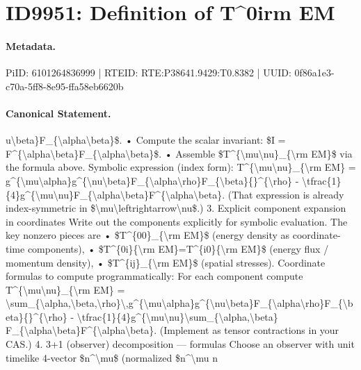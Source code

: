 \section*{ID9951: Definition of T\textasciicircum{}0irm EM}
\paragraph{Metadata.}
PiID: 6101264836999 | RTEID: RTE:P38641.9429:T0.8382 | UUID: 0f86a1e3-c70a-5ff8-8e95-ffa58eb6620b

\paragraph{Canonical Statement.}
u\textbackslash{}beta\}F\_\{\textbackslash{}alpha\textbackslash{}beta\}\$. • Compute the scalar invariant: \$I = F\textasciicircum{}\{\textbackslash{}alpha\textbackslash{}beta\}F\_\{\textbackslash{}alpha\textbackslash{}beta\}\$. • Assemble \$T\textasciicircum{}\{\textbackslash{}mu\textbackslash{}nu\}\_\{\textbackslash{}rm EM\}\$ via the formula above. Symbolic expression (index form): T\textasciicircum{}\{\textbackslash{}mu\textbackslash{}nu\}\_\{\textbackslash{}rm EM\} = g\textasciicircum{}\{\textbackslash{}mu\textbackslash{}alpha\}g\textasciicircum{}\{\textbackslash{}nu\textbackslash{}beta\}F\_\{\textbackslash{}alpha\textbackslash{}rho\}F\_\{\textbackslash{}beta\}\{\}\textasciicircum{}\{\textbackslash{}rho\} - \textbackslash{}tfrac\{1\}\{4\}g\textasciicircum{}\{\textbackslash{}mu\textbackslash{}nu\}F\_\{\textbackslash{}alpha\textbackslash{}beta\}F\textasciicircum{}\{\textbackslash{}alpha\textbackslash{}beta\}. (That expression is already index-symmetric in \$\textbackslash{}mu\textbackslash{}leftrightarrow\textbackslash{}nu\$.) 3. Explicit component expansion in coordinates Write out the components explicitly for symbolic evaluation. The key nonzero pieces are • \$T\textasciicircum{}\{00\}\_\{\textbackslash{}rm EM\}\$ (energy density as coordinate-time components), • \$T\textasciicircum{}\{0i\}\{\textbackslash{}rm EM\}=T\textasciicircum{}\{i0\}\{\textbackslash{}rm EM\}\$ (energy flux / momentum density), • \$T\textasciicircum{}\{ij\}\_\{\textbackslash{}rm EM\}\$ (spatial stresses). Coordinate formulas to compute programmatically: For each component compute T\textasciicircum{}\{\textbackslash{}mu\textbackslash{}nu\}\_\{\textbackslash{}rm EM\} = \textbackslash{}sum\_\{\textbackslash{}alpha,\textbackslash{}beta,\textbackslash{}rho\}\textbackslash{},g\textasciicircum{}\{\textbackslash{}mu\textbackslash{}alpha\}g\textasciicircum{}\{\textbackslash{}nu\textbackslash{}beta\}F\_\{\textbackslash{}alpha\textbackslash{}rho\}F\_\{\textbackslash{}beta\}\{\}\textasciicircum{}\{\textbackslash{}rho\} - \textbackslash{}tfrac\{1\}\{4\}g\textasciicircum{}\{\textbackslash{}mu\textbackslash{}nu\}\textbackslash{}sum\_\{\textbackslash{}alpha,\textbackslash{}beta\} F\_\{\textbackslash{}alpha\textbackslash{}beta\}F\textasciicircum{}\{\textbackslash{}alpha\textbackslash{}beta\}. (Implement as tensor contractions in your CAS.) 4. 3+1 (observer) decomposition — formulas Choose an observer with unit timelike 4-vector \$n\textasciicircum{}\textbackslash{}mu\$ (normalized \$n\textasciicircum{}\textbackslash{}mu n

